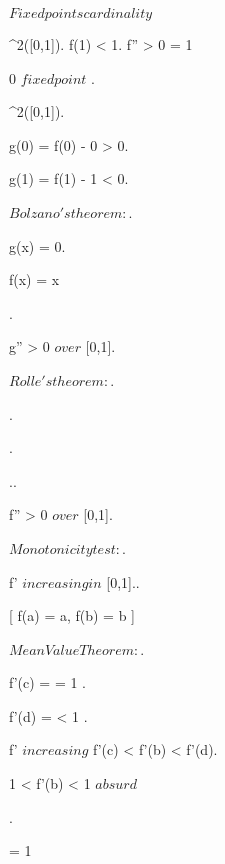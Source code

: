 \documentclass[../Main/main]{subfiles}
\begin{document}
\unit{ $ Fixed points cardinality $ }
{
	{
		{
			 \in \Cc^2([0,1]).
			f(1) < 1.
			f'' > 0 \in [0,1]
		}
		\showthat
		{
			 = 1
		}
		\demonstration
		{
			{
				
				{
					0 $ fixed point $
				}.
				{
					 \in \Cc^2([0,1]).

					g(0) = f(0) - 0 > 0.

					g(1) = f(1) - 1 < 0.

					$Bolzano's theorem: $.

					{
						g(x) = 0.

						f(x) = x
					}
				}


			}.
			
			{
				g'' > 0 $ over $ [0,1].

				$Rolle's theorem:$.

				 .

				 .

				 ..


				f'' > 0 $ over $ [0,1].

				$Monotonicity test:$.

				f' $ increasing in $ [0,1]..



				\all{ a < b \in [0,1) }[ f(a) = a, f(b) = b ]
				{
					$Mean Value Theorem:$.

					{
						f'(c) =  = 1
					}.

					{
						f'(d) =  < 1
					}.

					f' $ increasing $ \imp f'(c) < f'(b) < f'(d).

					1 < f'(b) < 1 $ absurd $
				}				 

			}.

			\conclude {} = 1

		}
	}
}
\end{document}

